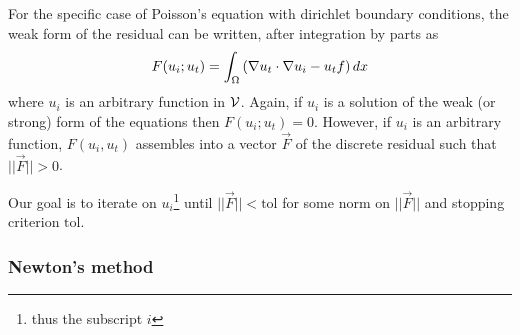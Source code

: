 For the specific case of Poisson's equation with dirichlet boundary conditions,
the weak form of the residual can be written, after integration by
parts as
\begin{equation}
  \label{eq:4}
  F(u_{i};u_{t}) = \int_{\Omega}
  \left(
    \nabla u_{t}\cdot\nabla u_{i} - u_{t}f
  \right)dx
\end{equation}
where $u_{i}$ is an arbitrary function in $\mathcal{V}$.   Again, if
$u_{i}$ is a solution of the weak (or strong) form of the equations
then $F(u_{i};u_{t})=0$.  However, if  $u_{i}$ is an arbitrary
function, $F(u_{i},u_{t})$ assembles into a vector $\vec{F}$ of the
discrete residual such that $||\vec{F}||>0$.  

Our goal is to iterate on $u_{i}$\footnote{thus the subscript
$i$} until $||\vec{F}||<\mathrm{tol}$ for some norm on $||\vec{F}||$ and stopping
criterion $\mathrm{tol}$.

\subsubsection{Newton's method}
\label{sec:newtons-method}

